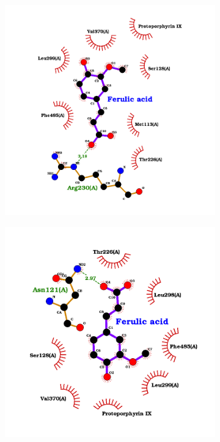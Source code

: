 \documentclass[12pt]{article}
\begin{document}
	\FloatBarrier
	\begin{figure}[h!]
		\centering
		\begin{subfigure}[h!]{0.35\textwidth}
			\hspace{2cm}
			\includegraphics[width=\textwidth]{../5/propose/Dock/Dock2/best.png}
			\caption{}
		\end{subfigure}
		\hfill
		\begin{subfigure}[h!]{0.35\textwidth}
			\hspace{-2cm}
			\includegraphics[width=\textwidth]{../5/propose/Dock/Dock2/best2.png}

\end{subfigure}
\end{figure}
\end{document}
